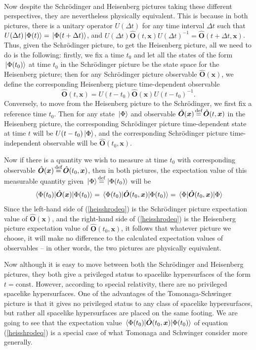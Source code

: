 \strut \\[\baselineskip] 
Now despite the Schr\"{o}dinger and Heisenberg pictures taking these different perspectives, they are nevertheless physically equivalent. This is because in both pictures, there is a unitary operator $U(\Delta t)$ for any time interval $\Delta t$ such that $U(\Delta t)\ket*{\Phi(t)}=\ket*{\Phi(t+\Delta t)}$, and $U(\Delta t)\hat{\bm{O}}(t, \bm{x})U(\Delta t)^{-1}=\hat{\bm{O}}(t+\Delta t, \bm{x})$. Thus, given the Schr\"{o}dinger picture, to get the Heisenberg picture, all we need to do is the following: firstly, we fix a time $t_0$ and let all the states of the form $\ket*{\Phi(t_0)}$ at time $t_0$ in the Schr\"{o}dinger picture be the state space for the Heisenberg picture; then for any Schr\"{o}dinger picture observable $\hat{\bm{O}}(\bm{x})$, we define the corresponding Heisenberg picture time-dependent observable 
$$\hat{\bm{O}}(t, \bm{x})=U(t-t_0)\hat{\bm{O}}(\bm{x})U(t-t_0)^{-1}.$$ 
Conversely, to move from the Heisenberg picture to the Schr\"{o}dinger, we first fix a reference time $t_0$. Then for any state $\ket*{\Phi}$ and observable $\hat{\bm{O}}(\bm{x})\myeq\hat{\bm{O}}(t, \bm{x})$ in the Heisenberg picture, the corresponding Schr\"{o}dinger picture time-dependent state at time $t$ will be $U(t-t_0)\ket*{\Phi}$, and the corresponding Schr\"{o}dinger picture time-independent observable will be $\hat{\bm{O}}(t_0, \bm{x})$.

Now if there is a quantity we wish to measure at time $t_0$ with corresponding observable $\hat{\bm{O}}(\bm{x})\myeq\hat{\bm{O}}(t_0, \bm{x})$, then in both pictures, the expectation value of this measurable quantity given $\ket*{\Phi}\myeq\ket*{\Phi(t_0)}$ will be 
\begin{equation}\label{heisshrodeq}
  \ev*{\hat{\bm{O}}(\bm{x})}{\Phi(t_0)}=\ev*{\hat{\bm{O}}(t_0,\bm{x})}{\Phi(t_0)}=\ev*{\hat{\bm{O}}(t_0, \bm{x})}{\Phi}
\end{equation}
Since the left-hand side of (\ref{heisshrodeq}) is the Schr\"{o}dinger picture expectation value of $\hat{\bm{O}}(\bm{x})$, and the right-hand side of (\ref{heisshrodeq}) is the Heisenberg picture expectation value of $\hat{\bm{O}}(t_0,\bm{x})$, it follows that whatever picture we choose, it will make no difference to the calculated expectation values of observables -- in other words, the two pictures are physically equivalent.

Now although it is easy to move between both the Schr\"{o}dinger and Heisenberg pictures, they both give a privileged status to spacelike hypersurfaces of the form $t=\text{const}$. However, according to special relativity, there are no privileged spacelike hypersurfaces. One of the advantages of the Tomonaga-Schwinger picture is that it gives no privileged status to any class of spacelike hypersurfaces, but rather all spacelike hypersurfaces are placed on the same footing. We are going to see that the expectation value $\ev*{\hat{\bm{O}}(t_0,\bm{x})}{\Phi(t_0)}$  of equation (\ref{heisshrodeq}) is a special case of what Tomonaga and Schwinger consider more generally. 

